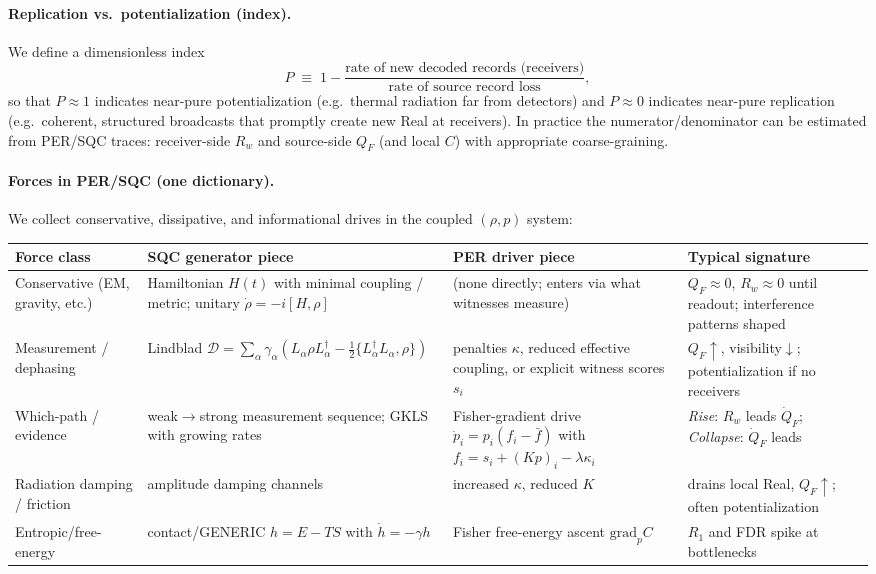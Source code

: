 \documentclass[11pt]{article}
\begin{document}
\paragraph{Replication vs.\ potentialization (index).}
We define a dimensionless index
\begin{equation}
P \;\equiv\; 1 - \frac{\text{rate of new decoded records (receivers)}}{\text{rate of source record loss}},
\end{equation}
so that $P\!\approx\!1$ indicates near-pure potentialization (e.g.\ thermal radiation far from detectors) and $P\!\approx\!0$ indicates near-pure replication (e.g.\ coherent, structured broadcasts that promptly create new Real at receivers).
In practice the numerator/denominator can be estimated from PER/SQC traces: receiver-side $R_w$ and source-side $Q_F$ (and local $C$) with appropriate coarse-graining.

\paragraph{Forces in PER/SQC (one dictionary).}
We collect conservative, dissipative, and informational drives in the coupled $(\rho,p)$ system:
\begin{center}
\begin{tabular}{@{}p{2.6cm}p{4.7cm}p{4.9cm}p{3.2cm}@{}}
\toprule
\textbf{Force class} & \textbf{SQC generator piece} & \textbf{PER driver piece} & \textbf{Typical signature} \\
\midrule
Conservative (EM, gravity, etc.) & Hamiltonian $H(t)$ with minimal coupling / metric; unitary $\dot\rho=-i[H,\rho]$ & (none directly; enters via what witnesses measure) & $Q_F\!\approx\!0$, $R_w\!\approx\!0$ until readout; interference patterns shaped \\
Measurement / dephasing & Lindblad $\mathcal D=\sum_\alpha \gamma_\alpha(L_\alpha\rho L_\alpha^\dagger-\tfrac12\{L_\alpha^\dagger L_\alpha,\rho\})$ & penalties $\kappa$, reduced effective coupling, or explicit witness scores $s_i$ & $Q_F\uparrow$, visibility$\downarrow$; potentialization if no receivers \\
Which-path / evidence & weak$\to$strong measurement sequence; GKLS with growing rates & Fisher-gradient drive $\dot p_i=p_i(f_i-\bar f)$ with $f_i=s_i+(Kp)_i-\lambda\kappa_i$ & \emph{Rise}: $R_w$ leads $\dot Q_F$; \emph{Collapse}: $\dot Q_F$ leads \\
Radiation damping / friction & amplitude damping channels & increased $\kappa$, reduced $K$ & drains local Real, $Q_F\uparrow$; often potentialization \\
Entropic/free-energy & contact/GENERIC $h=E-TS$ with $\dot h=-\gamma h$ & Fisher free-energy ascent $\mathrm{grad}_p C$ & $R_1$ and FDR spike at bottlenecks \\
\bottomrule
\end{tabular}
\end{center}
\end{document}
